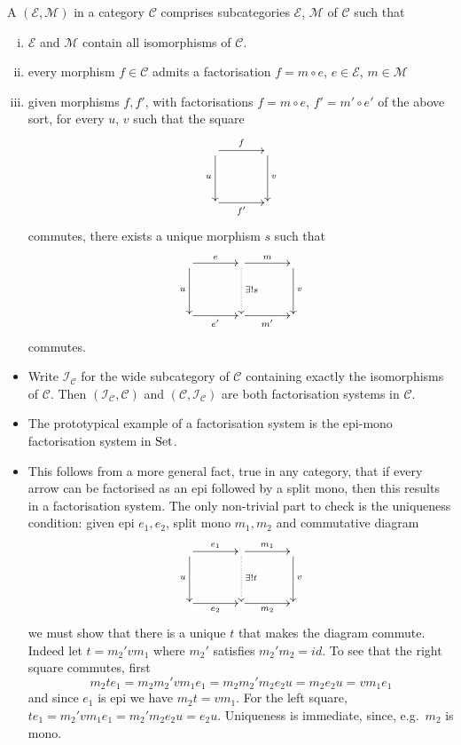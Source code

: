\begin{definition}
  A  $(\mathcal E,\mathcal M)$ in a category $\mathcal C$
  comprises subcategories $\mathcal E$, $\mathcal M$ of $\mathcal C$ such that
  \begin{enumerate}[(i)]
    \item $\mathcal E$ and $\mathcal M$ contain all isomorphisms of $\mathcal
      C$.
    \item  every morphism $f \in \mathcal C$ admits a factorisation $f=m \circ e$, $e \in
  \mathcal E$, $m \in \mathcal M$
\item given morphisms $f,f'$, with factorisations $f = m \circ e$, $f' = m' \circ
  e'$ of the above sort, for every $u$, $v$ such that the square
  \[
    \xymatrixcolsep{3pc}
    \xymatrixrowsep{3pc}
    \xymatrix{
       \ar[r]^f \ar[d]_u &  \ar[d]^v \\
       \ar[r]_{f'} & 
    }
  \]
  commutes, there exists a unique morphism $s$ such that
  \[
    \xymatrixcolsep{3pc}
    \xymatrixrowsep{3pc}
    \xymatrix{
      \ar[r]^e \ar[d]_u & \ar[r]^m \ar@{.>}[d]^{\exists! s} &  \ar[d]^v \\
       \ar[r]_{e'}& \ar[r]_{m'} & 
    }
  \]
  commutes.
  \end{enumerate}
\end{definition}

\begin{examples}
  \begin{itemize}
    \item Write $\mathcal I_{\mathcal C}$ for the wide subcategory of $\mathcal
      C$ containing exactly the isomorphisms of $\mathcal C$. Then $(\mathcal
      I_{\mathcal C}, \mathcal C)$ and $(\mathcal C, \mathcal I_{\mathcal C})$
      are both factorisation systems in $\mathcal C$. 
    
    \item The prototypical example of a factorisation system is the epi-mono
  factorisation system in $\mathrm{Set}$.

    \item This follows from a more general fact, true in any category, that if every arrow can be factorised
as an epi followed by a split mono, then this results in a factorisation system.
The only non-trivial part to check is the uniqueness condition: given epi $e_1,e_2$, 
split mono $m_1,m_2$ and commutative diagram
    \[
      \xymatrixcolsep{3pc}
      \xymatrixrowsep{3pc}
      \xymatrix{
  \ar[r]^{e_1} \ar[d]_u & \ar[r]^{m_1} \ar@{.>}[d]^{\exists! t} &  \ar[d]^v \\
  \ar[r]_{e_2}& \ar[r]_{m_2} & 
      }
    \]
we must show that there is a unique $t$ that makes the diagram commute.
Indeed let $t= m_2'vm_1$ where $m_2'$ satisfies $m_2'm_2=id$. 
To see that the right square commutes, first
\[
m_2 t e_1 =  m_2 m_2' v m_1 e_1 = m_2 m_2' m_2 e_2 u = m_2 e_2 u = v m_1 e_1
\]
and since $e_1$ is epi we have $m_2 t = v m_1$. For the left square,
$t e_1 = m_2' v m_1 e_1 = m_2' m_2 e_2 u = e_2 u$. Uniqueness is immediate,
since, e.g.\ $m_2$ is mono. 
\end{itemize}
\end{examples}

